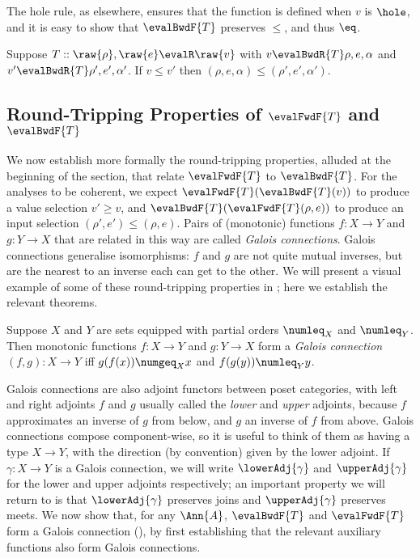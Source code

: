  The hole rule, as elsewhere, ensures that the function is defined when $v$ is $\hole$, and it is easy to show that $\evalBwdF{T}$  preserves $\leq$, and thus $\eq$.

\begin{lemma}
   Suppose $T :: \raw{\rho}, \raw{e} \evalR \raw{v}$ with $v \evalBwdR{T} \rho, e, \alpha $ and $v' \evalBwdR{T} \rho', e', \alpha' $. If $v \leq v'$ then $(\rho, e, \alpha) \leq (\rho', e', \alpha')$.
\end{lemma}

\subsection{Round-Tripping Properties of $\evalFwdF{T}$ and $\evalBwdF{T}$}
\label{sec:data-dependencies:galois-connections}

We now establish more formally the round-tripping properties, alluded at the beginning of the section, that relate $\evalFwdF{T}$ to $\evalBwdF{T}$. For the analyses to be coherent, we expect $\evalFwdF{T}(\evalBwdF{T}(v))$ to produce a value selection $v' \geq v$, and $\evalBwdF{T}(\evalFwdF{T}(\rho,e))$ to produce an input selection $(\rho',e') \leq (\rho,e)$. Pairs of (monotonic) functions $f: X \to Y$ and $g: Y \to X$ that are related in this way are called \emph{Galois connections}. Galois connections generalise isomorphisms: $f$ and $g$ are not quite mutual inverses, but are the nearest to an inverse each can get to the other. We will present a visual example of some of these round-tripping properties in ; here we establish the relevant theorems.

\begin{definition}
   Suppose $X$ and $Y$ are sets equipped with partial orders $\numleq_X$ and $\numleq_Y$. Then monotonic functions $f: X \to Y$ and $g: Y \to X$ form a \emph{Galois connection} $(f, g): X \to Y$ iff $g(f(x)) \numgeq_X x$ and $f(g(y)) \numleq_Y y$.
\end{definition}

\noindent Galois connections are also adjoint functors between poset categories, with left and right adjoints $f$ and $g$  usually called the \emph{lower} and \emph{upper} adjoints, because $f$ approximates an inverse of $g$ from below, and $g$ an inverse of $f$ from above. Galois connections compose component-wise, so it is useful to think of them as having a type $X \to Y$, with the direction (by convention) given by the lower adjoint. If $\gamma: X \to Y$ is a Galois connection, we will write $\lowerAdj{\gamma}$ and $\upperAdj{\gamma}$ for the lower and upper adjoints respectively; an important property we will return to is that $\lowerAdj{\gamma}$ preserves joins and $\upperAdj{\gamma}$ preserves meets. We now show that, for any $\Ann{A}$, $\evalBwdF{T}$ and $\evalFwdF{T}$ form a Galois connection (), by first establishing that the relevant auxiliary functions also form Galois connections.

